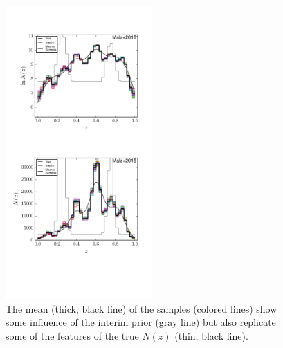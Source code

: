 \documentclass[preprint]{aastex}
\begin{document}
\begin{figure}
\includegraphics[width=0.5\textwidth]{figs/bint/samps.pdf}
\caption{The mean (thick, black line) of the samples (colored lines) show some 
influence of the interim prior (gray line) but also replicate some of the 
features of the true $N(z)$ (thin, black line).}
\label{fig:intb-samp}
\end{figure}
\end{document}
